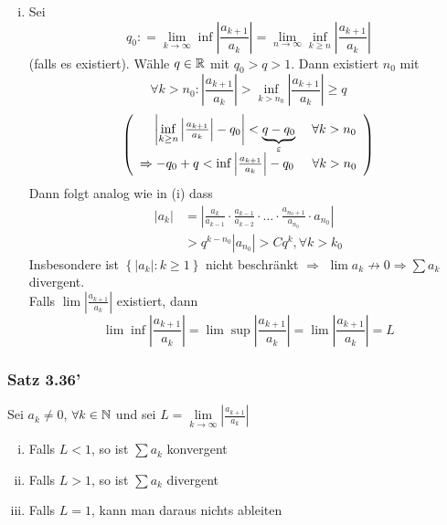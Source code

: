 \begin{beweis}{}
\begin{enumerate}[(i)]
\item Sei 
\[{q_0}: = \mathop {\lim }\limits_{k \to \infty } \inf \left| {\frac{{{a_{k + 1}}}}{{{a_k}}}} \right| = \mathop {\lim }\limits_{n \to \infty } \mathop {\inf }\limits_{k \ge n} \left| {\frac{{{a_{k + 1}}}}{{{a_k}}}} \right|\]
(falls es existiert). Wähle $q\in\mathbb{R}$ mit $q_0>q>1$. Dann existiert $n_0$ mit \[\forall k > {n_0}:\left| {\frac{{{a_{k + 1}}}}{{{a_k}}}} \right| > \mathop {\inf }\limits_{k > {n_0}} \left| {\frac{{{a_{k + 1}}}}{{{a_k}}}} \right| \ge q\]
\[\left( \begin{array}{l}
\hspace{4mm}\left| {\mathop {\inf }\limits_{k \ge n} \left| {\frac{{{a_{k + 1}}}}{{{a_k}}}} \right| - {q_0}} \right| < \underbrace {q - {q_0}}_\varepsilon \hspace{4mm}\forall k > {n_0}\\
 \Rightarrow  - {q_0} + q < \inf \left| {\frac{{{a_{k + 1}}}}{{{a_k}}}} \right| - {q_0}\hspace{5mm}\forall k > {n_0}
\end{array} \right)\]
Dann folgt analog wie in (i) dass 
\begin{align*}
\left| {{a_k}} \right|&= \left| {\frac{{{a_k}}}{{{a_{k - 1}}}} \cdot \frac{{{a_{k - 1}}}}{{{a_{k - 2}}}} \cdot  \ldots  \cdot \frac{{{a_{{n_0} + 1}}}}{{{a_{{n_0}}}}} \cdot {a_{{n_0}}}} \right|\\
&> {q^{k - {n_0}}}\left| {{a_{{n_0}}}} \right| > C{q^k}, \forall k>k_0
\end{align*}
Insbesondere ist $\left\{ {\left| {{a_k}} \right|:k \ge 1} \right\}$ nicht beschränkt $\Rightarrow$ $\lim a_k\not\to 0\Rightarrow\sum a_k$ divergent.\\
Falls $\lim \left| {\frac{{{a_{k + 1}}}}{{{a_k}}}} \right|$ existiert, dann \[\lim \inf \left| {\frac{{{a_{k + 1}}}}{{{a_k}}}} \right| = \lim \sup \left| {\frac{{{a_{k + 1}}}}{{{a_k}}}} \right| = \lim \left| {\frac{{{a_{k + 1}}}}{{{a_k}}}} \right| = L\]
\end{enumerate}
\end{beweis}

\subsubsection*{Satz 3.36'}
Sei $a_k\not=0$, $\forall k\in\mathbb{N}$ und sei $L = \mathop {\lim }\limits_{k \to \infty } \left| {\frac{{{a_{k + 1}}}}{{{a_k}}}} \right|$
\begin{enumerate}[(i)]
\item Falls $L<1$, so ist $\sum a_k$ konvergent
\item Falls $L>1$, so ist $\sum a_k$ divergent
\item Falls $L=1$, kann man daraus nichts ableiten 
\end{enumerate}
